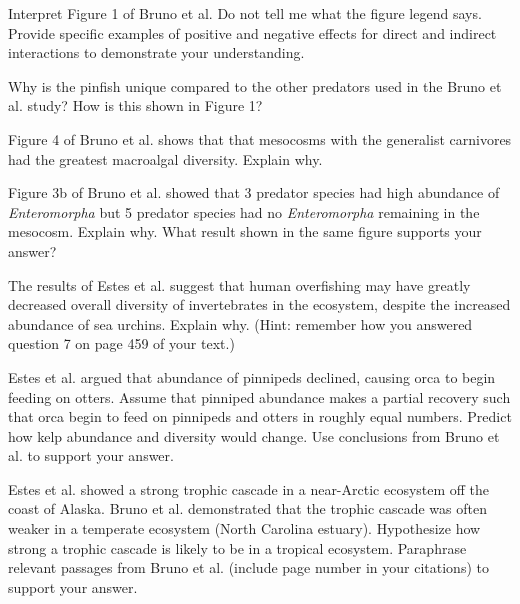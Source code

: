 \documentclass[11pt, addpoints]{exam}
\begin{document}
\begin{questions}

\question[6]
Interpret Figure 1 of Bruno et al. Do not tell me what the figure legend says. Provide specific examples of positive and negative effects for direct and indirect interactions to demonstrate your understanding. 

\question[4]
Why is the pinfish unique compared to the other predators used in the Bruno et al. study? How is this shown in Figure 1?

\question[4]
Figure 4 of Bruno et al. shows that that mesocosms with the generalist carnivores had the greatest macroalgal diversity. Explain why. 

\question[5]
Figure 3b of Bruno et al. showed that 3 predator species had high abundance of \textit{Enteromorpha} but 5 predator species had no \textit{Enteromorpha} remaining in the mesocosm. Explain why. What result shown in the same figure  supports your answer?

\question[5]
The results of Estes et al. suggest that human overfishing may have greatly decreased overall diversity of invertebrates in the ecosystem, despite the increased abundance of sea urchins. Explain why. (Hint: remember how you answered question 7 on page 459 of your text.)

\question[8]
Estes et al. argued that abundance of pinnipeds declined, causing orca to begin feeding on otters. Assume that pinniped abundance makes a partial recovery such that orca begin to feed on pinnipeds and otters in roughly equal numbers. Predict how kelp abundance and diversity would change. Use conclusions from Bruno et al. to support your answer. 

\question[8]
Estes et al. showed a strong trophic cascade in a near-Arctic ecosystem off the coast of Alaska.  Bruno et al. demonstrated that the trophic cascade was often weaker in a temperate ecosystem (North Carolina estuary). Hypothesize how strong a trophic cascade is likely to be in a tropical ecosystem. Paraphrase relevant passages from Bruno et al. (include page number in your citations) to support your answer.

\end{questions}
\end{document}
